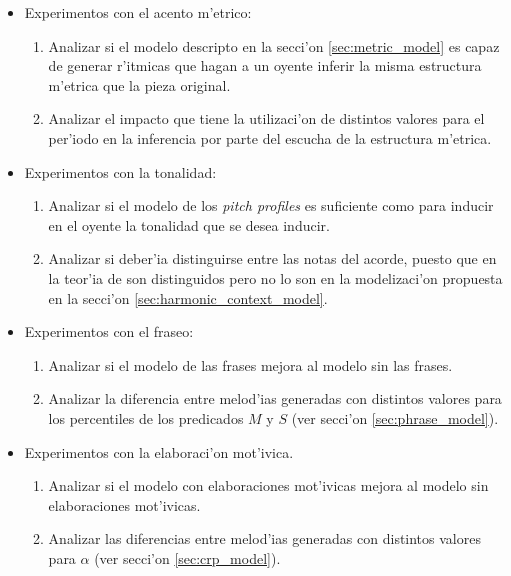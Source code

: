 \begin{itemize}
  \item Experimentos con el acento m'etrico:
    \begin{enumerate}
      \item Analizar si el modelo descripto en la secci'on \ref{sec:metric_model} es capaz de generar r'itmicas que hagan a un oyente inferir la misma 
            estructura m'etrica que la pieza original. 
      \item Analizar el impacto que tiene la utilizaci'on de distintos valores para el per'iodo en la inferencia por parte del escucha de la estructura m'etrica.

    \end{enumerate}

  \item Experimentos con la tonalidad: 
    \begin{enumerate}
      \item Analizar si el modelo de los \emph{pitch profiles} es suficiente como para inducir en el oyente la tonalidad que se desea inducir. 
      \item Analizar si deber'ia distinguirse entre las notas del acorde, puesto que en la teor'ia de \cite{Lerdahl2001} son distinguidos pero no lo son en 
      la modelizaci'on propuesta en la secci'on \ref{sec:harmonic_context_model}.
    \end{enumerate}

  \item Experimentos con el fraseo:
    \begin{enumerate}
      \item Analizar si el modelo de las frases mejora al modelo sin las frases.
      \item Analizar la diferencia entre melod'ias generadas con distintos valores para los percentiles de los predicados $M$ y $S$ (ver secci'on \ref{sec:phrase_model}).
    \end{enumerate}


  \item Experimentos con la elaboraci'on mot'ivica.
    \begin{enumerate}
      \item Analizar si el modelo con elaboraciones mot'ivicas mejora al modelo sin elaboraciones mot'ivicas.
      \item Analizar las diferencias entre melod'ias generadas con distintos valores para $\alpha$ (ver secci'on \ref{sec:crp_model}).

    \end{enumerate}



\end{itemize}


